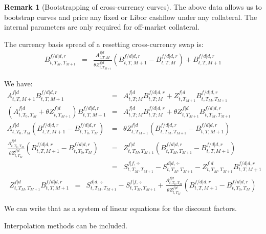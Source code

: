 \documentclass[11pt,english]{amsart}
\theoremstyle{definition}
\newtheorem{coro}{Corrolary}
\newtheorem{rema}{Remark}
\begin{document}
\begin{rema}[Bootstrapping of cross-currency curves]
The above data allows us to bootstrap curves and price any fixed or Libor cashflow under any collateral. 
The internal parameters are only required for off-market collateral.

The currency basis spread of a resetting cross-currency swap is:
\begin{eqnarray}
	B^{f/d|d,r}_{t,T_M,T_{M+1}} &=& 
	\frac{A^{f|d}_{t,T;M} }{\theta Z^{f|d}_{t,T_{M+1}}} \left( B^{f/d|d,r}_{t,T,M+1} - B^{f/d|d,r}_{t,T;M} \right) + B^{f/d|d,r}_{t,T,M+1}
\end{eqnarray}


We have:
\begin{eqnarray*}
	A^{f|d}_{t,T,M+1}   B^{f/d|d,r}_{t,T,M+1}  &=& 
	A^{f|d}_{t,T;M}   B^{f/d|d,r}_{t,T;M} + Z^{f|d}_{t,T_{M+1}} B^{f/d|d,r}_{t,T_M,T_{M+1}} \\
	\left(A^{f|d}_{t,T_0,T_{M}}  +\theta Z^{f|d}_{t,T_{M+1}} \right) B^{f/d|d,r}_{t,T,M+1}  &=& 
	A^{f|d}_{t,T;M}   B^{f/d|d,r}_{t,T;M} + \theta Z^{f|d}_{t,T_{M+1}} B^{f/d|d,r}_{t,T_M,T_{M+1}} \\
	A^{f|d}_{t,T_0,T_{M}} \left( B^{f/d|d,r}_{t,T,M+1}  - B^{f/d|d,r}_{t,T_0,T_{M}}  \right)  &=& 
	\theta Z^{f|d}_{t,T_{M+1}} \left( B^{f/d|d,r}_{t,T_M,T_{M+1}} - B^{f/d|d,r}_{t,T,M+1} \right) \\
	\frac{A^{f|d}_{t,T_0,T_{M}}}{\theta Z^{f|d}_{t,T_{M}}} \left( B^{f/d|d,r}_{t,T,M+1}  - B^{f/d|d,r}_{t,T_0,T_{M}}  \right)  &=& 
	Z^{f|d}_{t,T_M,T_{M+1}} \left( B^{f/d|d,r}_{t,T_M,T_{M+1}} - B^{f/d|d,r}_{t,T,M+1} \right) \\
	&=& S^{f|f,\div}_{t,T_M,T_{M+1}} - S^{d|d,\div}_{t,T_M,T_{M+1}}  - Z^{f|d}_{t,T_M,T_{M+1}} B^{f/d|d,r}_{t,T,M+1} 
\end{eqnarray*}
\begin{eqnarray}
	Z^{f|d}_{t,T_M,T_{M+1}} B^{f/d|d,r}_{t,T,M+1} 
       &=& S^{d|d,\div}_{t,T_M,T_{M+1}} - S^{f|f,\div}_{t,T_M,T_{M+1}} +  \frac{A^{f|d}_{t,T_0,T_{M}}}{\theta Z^{f|d}_{t,T_{M}}} \left( B^{f/d|d,r}_{t,T,M+1}  - B^{f/d|d,r}_{t,T_0,T_{M}}  \right)
\end{eqnarray}

We can write that as a system of linear equations for the discount factors.

Interpolation methods can be included.
\end{rema}
\end{document}
